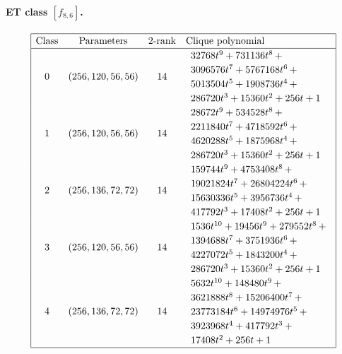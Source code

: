 \documentclass[12pt,a4paper]{article}
\begin{document}
\paragraph*{ET class $[f_{8,6}]$.}
%
\begin{table}[!bhpt] %
\small{}
\begin{align*}
\def\arraystretch{1.2}
\begin{array}{|cccl|}
\hline
\text{Class} &
\text{Parameters} &
\text{2-rank} &
\text{Clique polynomial}
\\
\hline
0 &
(256, 120, 56, 56) &
14 &
\begin{array}{l}
32768t^{9} + 731136t^{8}
\,+
\\
 3096576t^{7} + 5767168t^{6}
\,+
\\
 5013504t^{5} + 1908736t^{4}
\,+
\\
 286720t^{3} + 15360t^{2} + 256t + 1
\end{array}
\\
1 &
(256, 120, 56, 56) &
14 &
\begin{array}{l}
28672t^{9} + 534528t^{8}
\,+
\\
 2211840t^{7} + 4718592t^{6}
\,+
\\
 4620288t^{5} + 1875968t^{4}
\,+
\\
 286720t^{3} + 15360t^{2} + 256t + 1
\end{array}
\\
2 &
(256, 136, 72, 72) &
14 &
\begin{array}{l}
159744t^{9} + 4753408t^{8}
\,+
\\
 19021824t^{7} + 26804224t^{6}
\,+
\\
 15630336t^{5} + 3956736t^{4}
\,+
\\
 417792t^{3} + 17408t^{2} + 256t + 1
\end{array}
\\
3 &
(256, 120, 56, 56) &
14 &
\begin{array}{l}
1536t^{10} + 19456t^{9} + 279552t^{8}
\,+
\\
 1394688t^{7} + 3751936t^{6}
\,+
\\
 4227072t^{5} + 1843200t^{4}
\,+
\\
 286720t^{3} + 15360t^{2} + 256t + 1
\end{array}
\\
4 &
(256, 136, 72, 72) &
14 &
\begin{array}{l}
5632t^{10} + 148480t^{9}
\,+
\\
 3621888t^{8} + 15206400t^{7}
\,+
\\
 23773184t^{6} + 14974976t^{5}
\,+
\\
 3923968t^{4} + 417792t^{3}
\,+
\\
 17408t^{2} + 256t + 1
\end{array}
\\
\hline
\end{array}
\end{align*}
\caption{$f_{8,6}$ extended Cayley classes (part 1)}
\label{tab-c8_6_EC_classes}
\end{table}
\end{document}
